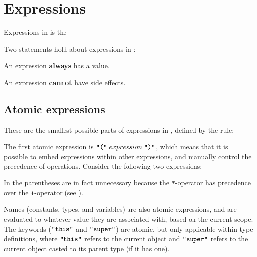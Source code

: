 \section{Expressions}
\label{sec:expressions}

Expressions in \productname{} is the 

\begin{ebnf}
\end{ebnf}

Two statements hold about expressions in \productname{}:

\begin{nlist}
\item An expression \textbf{always} has a value.
\item An expression \textbf{cannot} have side effects.
\end{nlist}

\subsection{Atomic expressions}
\label{sec:atomicexpressions}

These are the smallest possible parts of expressions in \productname{}, defined by
the rule:

\begin{ebnf}
\end{ebnf}

The first atomic expression is $\texttt{"("} \; expression \; \texttt{")"}$, which means
that it is possible to embed expressions within other expressions, and manually control
the precedence of operations. Consider the following two expressions:


In  the parentheses are in fact unnecessary because the
\texttt{*}-operator has precedence over the \texttt{+}-operator (see
).

Names (constants, types, and variables) are also atomic expressions, and are evaluated
to whatever value they are associated with, based on the current scope. The keywords
($\texttt{"this"}$ and $\texttt{"super"}$) are atomic, but only applicable within type
definitions, where $\texttt{"this"}$ refers to the current object and $\texttt{"super"}$
refers to the current object casted to its parent type (if it has one). 

